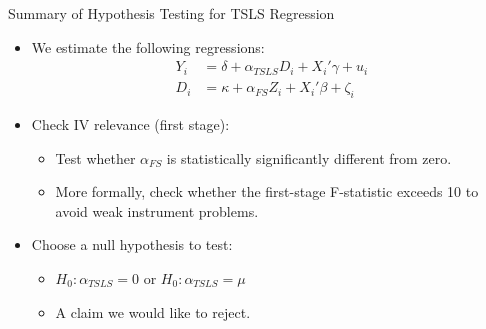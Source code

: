 \documentclass[dvipsnames,hyperref={pdfpagelabels=false}]{beamer}
\begin{document}
\begin{frame}{Summary of Hypothesis Testing for TSLS Regression}
	\begin{itemize}
		\item We estimate the following regressions:
		\begin{equation*}
			\begin{aligned}
				Y_i &= \delta + \alpha_{TSLS} D_i +  X_i' \gamma + u_{i}  \\
				D_i &=  \kappa + \alpha_{FS} Z_i +  X_i' \beta + \zeta_i  
			\end{aligned}
		\end{equation*}
		\item[1.] Check IV relevance (first stage):
		\begin{itemize}
			\vspace{0.2cm}
			\item Test whether $\alpha_{FS}$ is statistically significantly different from zero.
						\vspace{0.2cm}
			\item More formally, check whether the first-stage F-statistic exceeds 10 to avoid weak instrument problems.
						\vspace{0.2cm}
		\end{itemize}
		\item[2.] Choose a null hypothesis to test:
		\begin{itemize}
			\vspace{0.2cm}
			\item $H_0: \alpha_{TSLS} = 0$ or $H_0: \alpha_{TSLS} = \mu$
						\vspace{0.2cm}
			\item A claim we would like to reject.
		\end{itemize}
	\end{itemize}
\end{frame}
\end{document}

